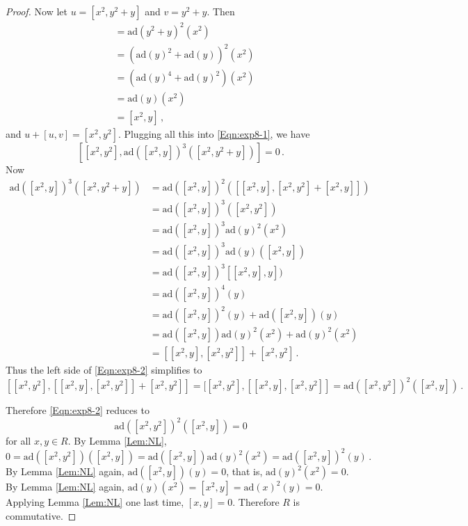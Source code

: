 \documentclass[10pt,a4paper]{amsart}
\newcommand{\ad}[1]{\mathrm{ad}(#1)}
\begin{document}
\begin{proof}
	Now let $u = [x^2,y^2 + y]$ and $v = y^2 + y$. Then 
	\begin{align*}
		[u,v] &= \ad{y^2 + y}^2(x^2) \\
		&= (\ad{y}^2+\ad{y})^2(x^2) \\
		&= (\ad{y}^4 + \ad{y}^2)(x^2) \\
		&= \ad{y}(x^2) \\
		&= [x^2,y]\,,
	\end{align*}
	and $u + [u,v] = [x^2,y^2]$. Plugging all this into \eqref{Eqn:exp8-1}, we have
	\begin{equation}\label{Eqn:exp8-2}
		[[x^2,y^2], \ad{[x^2,y]}^3([x^2,y^2 + y])] = 0\,.
	\end{equation}
	Now
	\begin{align*}
		\ad{[x^2,y]}^3([x^2,y^2 + y]) &= \ad{[x^2,y]}^2([[x^2,y],[x^2,y^2] + [x^2,y]]) \\
		&= \ad{[x^2,y]}^3([x^2,y^2]) \\
		&= \ad{[x^2,y]}^3\ad{y}^2(x^2) \\
		&= \ad{[x^2,y]}^3\ad{y}([x^2,y]) \\
		&= \ad{[x^2,y]}^3[[x^2,y],y]) \\
		&= \ad{[x^2,y]}^4(y) \\
		&= \ad{[x^2,y]}^2(y) + \ad{[x^2,y]}(y) \\
		&= \ad{[x^2,y]}\ad{y}^2(x^2) + \ad{y}^2(x^2) \\
		&= [[x^2,y],[x^2,y^2]] + [x^2,y^2]\,.
	\end{align*}
	Thus the left side of \eqref{Eqn:exp8-2} simplifies to
	\[
	[[x^2,y^2],[[x^2,y],[x^2,y^2]] + [x^2,y^2]] = [[x^2,y^2],[[x^2,y],[x^2,y^2]] = \ad{[x^2,y^2]}^2([x^2,y])\,.
	\]
	
	Therefore \eqref{Eqn:exp8-2} reduces to
	\[
	\ad{[x^2,y^2]}^2([x^2,y]) = 0
	\]
	for all $x,y\in R$. By Lemma \ref{Lem:NL},
	\[
	0 = \ad{[x^2,y^2]}([x^2,y]) = \ad{[x^2,y]}\ad{y}^2(x^2) = \ad{[x^2,y]}^2(y)\,.
	\]
	By Lemma \ref{Lem:NL} again, $\ad{[x^2,y]}(y) = 0$, 
	that is, $\ad{y}^2(x^2) = 0$. By Lemma \ref{Lem:NL} again, $\ad{y}(x^2) = [x^2,y] = \ad{x}^2(y) = 0$.
	Applying Lemma \ref{Lem:NL} one last time, $[x,y] = 0$. Therefore $R$ is commutative.
\end{proof}
\end{document}
